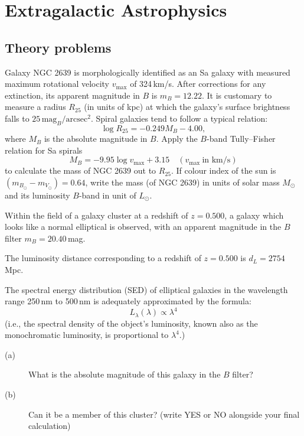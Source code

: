 \chapter{Extragalactic Astrophysics}

\section*{Theory problems}

Galaxy NGC 2639 is morphologically identified as an Sa galaxy with measured
maximum rotational velocity $v_{\max}$ of 324\,km/s. After corrections for any
extinction, its apparent magnitude in $B$ is $m_B = 12.22$. It is customary to
measure a radius $R_{25}$ (in units of kpc) at which the galaxy's surface
brightness falls to $25\,\mathrm{mag}_B/\mathrm{arcsec}^2$. Spiral galaxies
tend to follow a typical relation:
\[ \log R_{25} = -0.249 M_B - 4.00, \]
where $M_B$ is the absolute magnitude in $B$. Apply the $B$-band Tully--Fisher
relation for Sa spirals
\[ M_B = -9.95 \log v_{\max} + 3.15 \quad (v_{\max}\ \text{in km/s}) \]
to calculate the mass of NGC 2639 out to $R_{25}$. If colour index of the sun
is $(m_{B_\odot} - m_{V_\odot}) = 0.64$, write the mass (of NGC 2639) in units
of solar mass $M_\odot$ and its luminosity $B$-band in unit of $L_\odot$.

Within the field of a galaxy cluster at a redshift of $z = 0.500$, a galaxy
which looks like a normal elliptical is observed, with an apparent magnitude in
the $B$ filter $m_B = 20.40$\,mag.

The luminosity distance corresponding to a redshift of $z = 0.500$ is
$d_L = 2754$\,Mpc.

The spectral energy distribution (SED) of elliptical galaxies in the wavelength
range 250\,nm to 500\,nm is adequately approximated by the formula:
\[ L_\lambda(\lambda) \propto \lambda^4 \]
(i.e., the spectral density of the object's luminosity, known also as the
monochromatic luminosity, is proportional to $\lambda^4$.)

\begin{description}
\item[(a)] What is the absolute magnitude of this galaxy in the $B$ filter?
\item[(b)] Can it be a member of this cluster? (write YES or NO alongside your
  final calculation)
\end{description}

